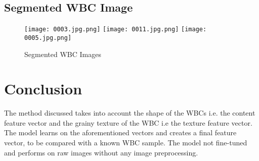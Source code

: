\documentclass[]{article}
\begin{document}
\subsection{Segmented WBC Image}
\begin{figure}
\centering
\texttt{[image: 0003.jpg.png]}
\bigskip
\bigskip
\texttt{[image: 0011.jpg.png]}
\bigskip
\bigskip
\texttt{[image: 0005.jpg.png]}
\bigskip
\caption{Segmented WBC Images}
\label{fig:0003}
\end{figure}

\section{Conclusion}
The method discussed takes into account the shape of the WBCs i.e. the content feature vector and the grainy texture of the WBC i.e the texture feature vector. The model learns on the aforementioned vectors and creates a final feature vector, to be compared with a known WBC sample. The model not fine-tuned and performs on  raw images without any image preprocessing. 
 
\end{document}
